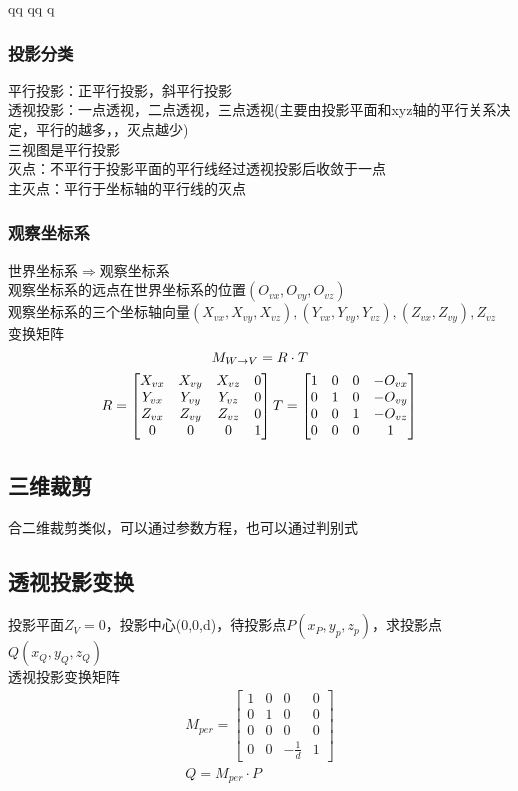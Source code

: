 qq	qq	q                                                                                                                                                                                                                                                                                      \documentclass{article}
\begin{document}
\begin{CJK}{UTF8}{gbsn}
	\subsubsection{投影分类}
	平行投影：正平行投影，斜平行投影\\
	透视投影：一点透视，二点透视，三点透视(主要由投影平面和xyz轴的平行关系决定，平行的越多，，灭点越少)\\
	三视图是平行投影\\
	灭点：不平行于投影平面的平行线经过透视投影后收敛于一点\\
	主灭点：平行于坐标轴的平行线的灭点\\
	\subsubsection{观察坐标系}
	世界坐标系$\Rightarrow$观察坐标系\\
	观察坐标系的远点在世界坐标系的位置$(O_{vx},O_{vy},O_{vz})$\\
	观察坐标系的三个坐标轴向量$(X_{vx},X_{vy},X_{vz}),(Y_{vx},Y_{vy},Y_{vz}),(Z_{vx},Z_{vy}),Z_{vz}$\\
	变换矩阵\\
	$$
	M_{W\rightarrow V}=R\cdot T\\
	$$
	$$
	R = \begin{bmatrix}
	X_{vx}&X_{vy}&X_{vz}&0\\
	Y_{vx}&Y_{vy}&Y_{vz}&0\\
	Z_{vx}&Z_{vy}&Z_{vz}&0\\
	0&0&0&1
	\end{bmatrix}\\
	T=\begin{bmatrix}
	1&0&0&-O_{vx}\\
	0&1&0&-O_{vy}\\
	0&0&1&-O_{vz}\\
	0&0&0&1
	\end{bmatrix}
	$$
	\subsection{三维裁剪}
	合二维裁剪类似，可以通过参数方程，也可以通过判别式\\
	\subsection{透视投影变换}
	投影平面$Z_V=0$，投影中心(0,0,d)，待投影点$P(x_P,y_p,z_p)$，求投影点$Q(x_Q,y_Q,z_Q)$\\
	透视投影变换矩阵\\
	\begin{equation*}
	\begin{split}	
	M_{per}=\begin{bmatrix}
	1&0&0&0\\
	0&1&0&0\\
	0&0&0&0\\
	0&0&-\frac{1}{d}&1
	\end{bmatrix}\\
	Q=M_{per}\cdot P\\
	\end{split}
	\end{equation*}
	

\end{CJK}
\end{document}

